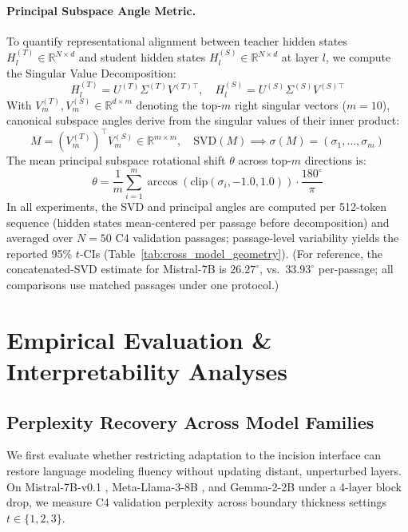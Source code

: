 \documentclass[pmlr,onecolumn]{jmlr}
\begin{document}
\paragraph{Principal Subspace Angle Metric.}
To quantify representational alignment between teacher hidden states $H^{(T)}_l \in \mathbb{R}^{N \times d}$ and student hidden states $H^{(S)}_l \in \mathbb{R}^{N \times d}$ at layer $l$, we compute the Singular Value Decomposition:
\begin{equation}
H^{(T)}_l = U^{(T)} \Sigma^{(T)} V^{(T)\top}, \quad H^{(S)}_l = U^{(S)} \Sigma^{(S)} V^{(S)\top}
\end{equation}
With $V_m^{(T)}, V_m^{(S)} \in \mathbb{R}^{d \times m}$ denoting the top-$m$ right singular vectors ($m=10$), canonical subspace angles derive from the singular values of their inner product:
\begin{equation}
M = (V_m^{(T)})^\top V_m^{(S)} \in \mathbb{R}^{m \times m}, \quad \mathrm{SVD}(M) \implies \sigma(M) = (\sigma_1, \dots, \sigma_m)
\end{equation}
The mean principal subspace rotational shift $\theta$ across top-$m$ directions is:
\begin{equation}
\theta = \frac{1}{m} \sum_{i=1}^{m} \arccos\left(\mathrm{clip}(\sigma_i, -1.0, 1.0)\right) \cdot \frac{180^\circ}{\pi}
\label{eq:principal_angle}
\end{equation}
In all experiments, the SVD and principal angles are computed per 512-token sequence (hidden states mean-centered per passage before decomposition) and averaged over $N=50$ C4 validation passages; passage-level variability yields the reported 95\% $t$-CIs (Table~\ref{tab:cross_model_geometry}). (For reference, the concatenated-SVD estimate for Mistral-7B is $26.27^\circ$, vs.\ $33.93^\circ$ per-passage; all comparisons use matched passages under one protocol.)

\section{Empirical Evaluation \& Interpretability Analyses}

\subsection{Perplexity Recovery Across Model Families}

We first evaluate whether restricting adaptation to the incision interface can restore language modeling fluency without updating distant, unperturbed layers. On Mistral-7B-v0.1 \citep{jiang2023mistral}, Meta-Llama-3-8B \citep{dubey2024llama3}, and Gemma-2-2B \citep{team2024gemma2} under a 4-layer block drop, we measure C4 validation perplexity \citep{raffel2020c4} across boundary thickness settings $t \in \{1, 2, 3\}$.
\end{document}
